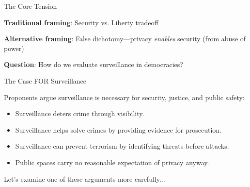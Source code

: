﻿\documentclass[aspectratio=169,11pt]{beamer}
\begin{document}
\begin{frame}{The Core Tension}
\begin{center}
\end{center}

\vspace{0.3em}
\textbf{Traditional framing}: Security vs. Liberty tradeoff

\textbf{Alternative framing}: False dichotomy---privacy \emph{enables} security (from abuse of power)

\textbf{Question}: How do we evaluate surveillance in democracies?
\end{frame}

\begin{frame}{The Case FOR Surveillance}
\begin{probox}
\small
Proponents argue surveillance is necessary for security, justice, and public safety:
\begin{itemize}
    \item Surveillance deters crime through visibility.
    \item Surveillance helps solve crimes by providing evidence for prosecution.
    \item Surveillance can prevent terrorism by identifying threats before attacks.
    \item Public spaces carry no reasonable expectation of privacy anyway.
\end{itemize}
\end{probox}

\vspace{0.3em}
Let's examine one of these arguments more carefully...
\end{frame}
\end{document}
